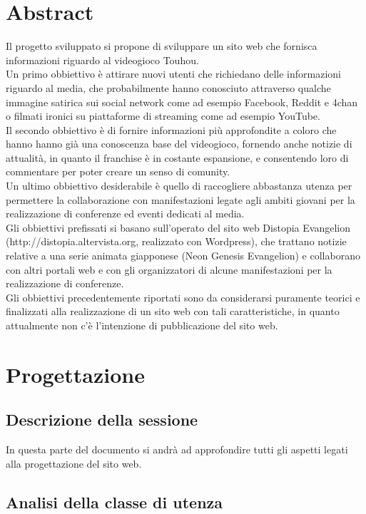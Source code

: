 \documentclass[openany, a4paper, 12pt]{report}
\begin{document}
	\chapter{Abstract}
	Il progetto sviluppato si propone di sviluppare un sito web che fornisca informazioni riguardo al videogioco Touhou.\\
	Un primo obbiettivo è attirare nuovi utenti che richiedano delle informazioni riguardo al media, che probabilmente hanno conosciuto attraverso qualche immagine satirica sui social network come ad esempio Facebook, Reddit e 4chan o filmati ironici su piattaforme di streaming come ad esempio YouTube.\\
	Il secondo obbiettivo è di fornire informazioni più approfondite a coloro che hanno hanno già una conoscenza base del videogioco, fornendo anche notizie di attualità, in quanto il franchise è in costante espansione, e consentendo loro di commentare per poter creare un senso di comunity.\\
	Un ultimo obbiettivo desiderabile è quello di raccogliere abbastanza utenza per permettere la collaborazione con manifestazioni legate agli ambiti giovani per la realizzazione di conferenze ed eventi dedicati al media.\\
	Gli obbiettivi prefissati si basano sull'operato del sito web Distopia Evangelion (http://distopia.altervista.org, realizzato con Wordpress), che trattano notizie relative a una serie animata giapponese (Neon Genesis Evangelion) e collaborano con altri portali web e con gli organizzatori di alcune manifestazioni per la realizzazione di conferenze.\\
	Gli obbiettivi precedentemente riportati sono da considerarsi puramente teorici e finalizzati alla realizzazione di un sito web con tali caratteristiche, in quanto attualmente non c'è l'intenzione di pubblicazione del sito web.

	\chapter{Progettazione}
	
	\section{Descrizione della sessione}
		In questa parte del documento si andrà ad approfondire tutti gli aspetti legati alla progettazione del sito web.
	
	\section{Analisi della classe di utenza}
	
\end{document}
